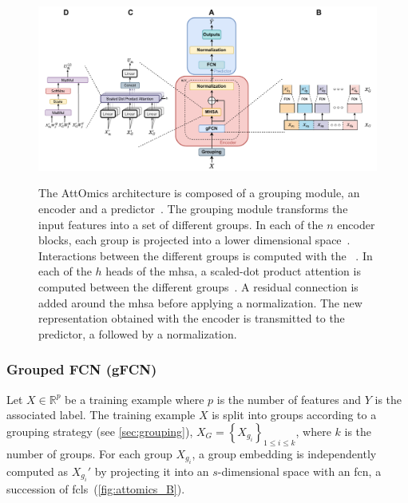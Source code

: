 \documentclass[../main.tex]{subfiles}
\begin{document}
	 \begin{figure}[htbp]
		 \centering
		 \begin{subcaptiongroup}
			 \includegraphics[width=\textwidth]{Beaude.168.fig.1.pdf}
			 \label{fig:attomics_A}
			 \label{fig:attomics_B}
			 \label{fig:attomics_C}
			 \label{fig:attomics_D}
		 \end{subcaptiongroup}
		 \caption[The AttOmics architecture]{The AttOmics architecture is composed of a grouping module, an encoder and a predictor~. The grouping module transforms the input features into a set of different groups. In each of the $n$ encoder blocks, each group is projected into a lower dimensional space~. Interactions between the different groups is computed with the ~. In each of the $h$ heads of the \gls{mhsa}, a scaled-dot product attention is computed between the different groups~. A residual connection is added around the \gls{mhsa} before applying a normalization. The new representation obtained with the encoder is transmitted to the predictor, a  followed by a normalization.~}\label{fig:attomics_arch}
	 \end{figure}

	 \subsubsection{Grouped FCN (gFCN)}
		 Let $X \in \mathbb{R}^p$ be a training example where $p$ is the number of features and $Y$ is the associated label.
		 The training example $X$ is split into groups according to a grouping strategy (see \cref{sec:grouping}), $ X_G = \left\{X_{g_i} \right\}_{1 \leq i \leq k}$, where $k$ is the number of groups.
		 For each group  $X_{g_i}$, a group embedding is independently computed as $X_{g_i}'$ by projecting it into an $s$-dimensional space with an \gls{fcn}, a succession of \glspl{fcl}~(\cref{fig:attomics_B}).
\end{document}
